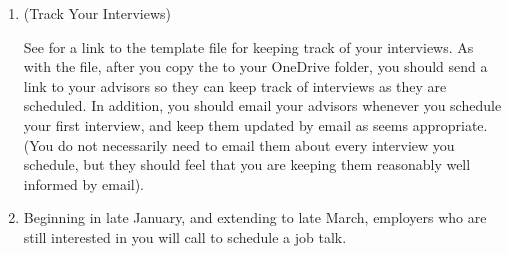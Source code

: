 \documentclass{\classes/econtex}
\begin{document}
\begin{enumerate}
\begin{quote}
\begin{itemize}
    \item  Develop a clear, SHORT (30 seconds) description of what your job market paper and dissertation are about. Then have another 2 minutes worth that you can say if you are allowed to get through the 30 seconds without interruption.
    \item  Write out your key points as bullet points, and commit them to memory. Be prepared to be interrupted and still be able to recover and return to say the key things you wanted to say.
      \begin{itemize}
      \item If you can't explain what you have done in a short, memorable way, you are doomed. DOOMED!
      \end{itemize}
    \item  Be confident but not arrogant. Don't look at the floor or ceiling, look at the interviewers. If the interview is by Zoom, you will be sorely tempted to look at the face on your screen when you want to talk to someone.  REMEMBER that the way to look someone in the face is to LOOK AT YOUR CAMERA.  %
    \item  Be clear about what your contribution is relative to the existing literature. A new theoretical result or approach? A new empirical approach? New data? Better data? Something else?
    \end{itemize}
  \end{quote}

  \hypertarget{track-your-interviews}{} %
\item (Track Your Interviews)

  See {\Templatesurl} for a link to the template file for keeping track of your interviews.  As with the {\EMW} file, after you copy the {\interviewsMoniker} to your OneDrive folder, you should send a link to your advisors so they can keep track of interviews as they are scheduled.  In addition, you should email your advisors whenever you schedule your first interview, and keep them updated by email as seems appropriate.  (You do not necessarily need to email them about every interview you schedule, but they should feel that you are keeping them reasonably well informed by email).
  
  \hypertarget{Job-Talks-Scheduled}{}
\item Beginning in late January, and extending to late March,
  employers who are still interested in you will call to schedule a
  job talk.


\end{enumerate}
\end{document}
